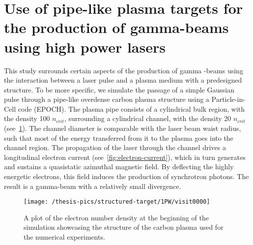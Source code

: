 \documentclass[12pt, class=report, crop=false]{standalone}
\begin{document}
\chapter*{Use of pipe-like plasma targets for the production of gamma-beams using high power lasers}%

This study surrounds certain aspects of the production of gamma
-beams using the interaction between a laser pulse and a plasma medium
with a predesigned structure. To be more specific, we simulate the
passage of a simple Gaussian pulse through a pipe-like overdense
carbon plasma structure using a Particle-in-Cell code (EPOCH). The
plasma pipe consists of a cylindrical bulk region, with the density
100 \(n_{crit}\), surrounding a cylindrical channel, with the density
20 \(n_{crit}\) (see~\cref{fig:pipe}). The channel diameter is
comparable with the laser beam waist radius, such that most of the
energy transferred from it to the plasma goes into the channel region. The
propagation of the laser through the channel drives a longitudinal
electron current (see~\cref{fig:electron-current}), which in turn
generates and sustains a quasistatic azimuthal magnetic field. By
deflecting the highly energetic electrons, this field induces the
production of synchrotron photons. The result is a gamma-beam with a
relatively small divergence.

\begin{figure}[!h]
  \centering
  \texttt{[image: /thesis-pics/structured-target/1PW/visit0000]}%
  \caption{A plot of the electron number density at the beginning of
  the simulation showcasing the structure of the carbon plasma used
  for the numerical experiments.}
  \label{fig:pipe}%
\end{figure}
\end{document}
